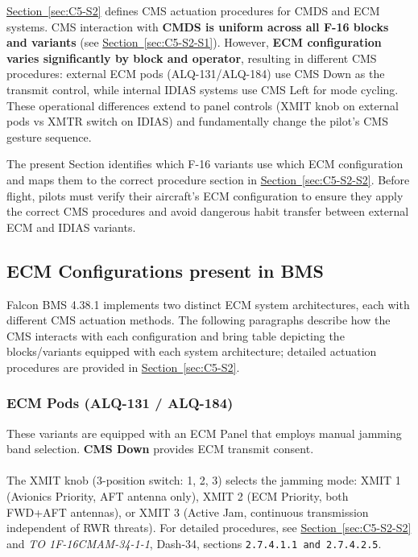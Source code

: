 \documentclass[11pt, a4paper, twoside]{report}
\newcommand{\dashrefs}[1]{\textit{TO 1F-16CMAM-34-1-1}, Dash-34, sections \texttt{#1}}
\newcommand{\secref}[1]{\hyperref[#1]{Section~\ref*{#1}}}
\begin{document}
\secref{sec:C5-S2} defines CMS actuation procedures for CMDS and ECM systems. 
CMS interaction with \textbf{CMDS is uniform across all F-16 blocks and variants} (see \secref{sec:C5-S2-S1}). However, \textbf{ECM configuration varies significantly by block and operator}, resulting in different CMS procedures: external ECM pods (ALQ-131/ALQ-184) use CMS Down as the transmit control, while internal IDIAS systems use CMS Left for mode cycling. These operational differences extend to panel controls (XMIT knob on external pods vs XMTR switch on IDIAS) and fundamentally change the pilot's CMS gesture sequence.

The present Section identifies which F-16 variants use which ECM configuration and maps them to the correct procedure section in \secref{sec:C5-S2-S2}. Before flight, pilots must verify their aircraft's ECM configuration to ensure they apply the correct CMS procedures and avoid dangerous habit transfer between external ECM and IDIAS variants.

\subsection{ECM Configurations present in BMS}
\label{sec:C5-S3-S1}

Falcon BMS 4.38.1 implements two distinct ECM system architectures, each with different CMS actuation methods. The following paragraphs describe how the CMS interacts with each configuration and bring table depicting the blocks/variants equipped with each system architecture; detailed actuation procedures are provided in \secref{sec:C5-S2}.

\subsubsection{ECM Pods (ALQ-131 / ALQ-184)}
\label{sec:C5-S3-S1-S1}

These variants are equipped with an ECM Panel that employs manual jamming band selection. \textbf{CMS Down} provides ECM transmit consent.\\\\
The XMIT knob (3-position switch: 1, 2, 3) selects the jamming mode: XMIT 1 (Avionics Priority, AFT antenna only), XMIT 2 (ECM Priority, both FWD+AFT antennas), or XMIT 3 (Active Jam, continuous transmission independent of RWR threats). For detailed procedures, see \secref{sec:C5-S2-S2} and \dashrefs{2.7.4.1.1 and 2.7.4.2.5}.
\end{document}
